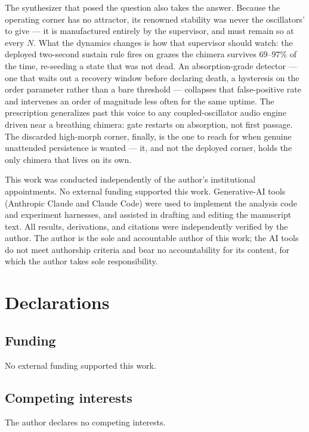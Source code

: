 \documentclass[pdflatex,sn-mathphys,Numbered]{sn-jnl}
\begin{document}
The synthesizer that posed the question also takes the answer. Because the
operating corner has no attractor, its renowned stability was never the
oscillators' to give --- it is manufactured entirely by the supervisor, and must
remain so at every $N$. What the dynamics changes is how that supervisor should
watch: the deployed two-second sustain rule fires on grazes the chimera survives
$69$--$97\%$ of the time, re-seeding a state that was not dead. An
absorption-grade detector --- one that waits out a recovery window before
declaring death, a hysteresis on the order parameter rather than a bare
threshold --- collapses that false-positive rate and intervenes an order of
magnitude less often for the same uptime. The prescription generalizes past this
voice to any coupled-oscillator audio engine driven near a breathing chimera:
gate restarts on absorption, not first passage. The discarded high-morph corner,
finally, is the one to reach for when genuine unattended persistence is wanted ---
it, and not the deployed corner, holds the only chimera that lives on its own.

\backmatter

This work was conducted independently of the author's institutional appointments.
No external funding supported this work. Generative-AI tools (Anthropic Claude and
Claude Code) were used to implement the analysis code and experiment harnesses, and
assisted in drafting and editing the manuscript text. All results, derivations, and
citations were independently verified by the author. The author is the sole and
accountable author of this work; the AI tools do not meet authorship criteria and
bear no accountability for its content, for which the author takes sole
responsibility.

\section*{Declarations}

\subsection*{Funding}
No external funding supported this work.

\subsection*{Competing interests}
The author declares no competing interests.
\end{document}

